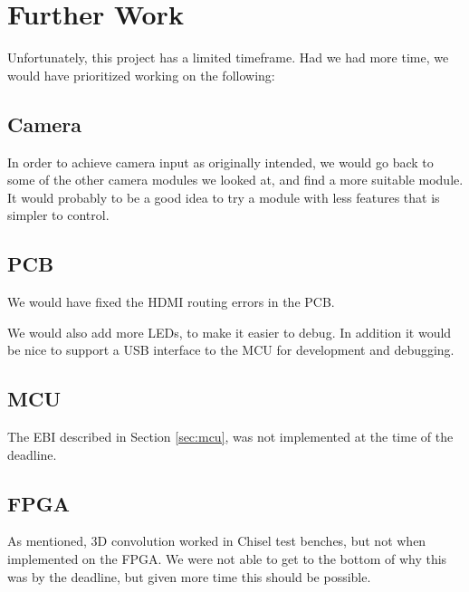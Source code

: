 \section{Further Work}

Unfortunately, this project has a limited timeframe.
Had we had more time, we would have prioritized working on the following:

\subsection{Camera}

In order to achieve camera input as originally intended, we would go back to some of the other camera modules we looked at, and find a more suitable module.
It would probably to be a good idea to try a module with less features that is simpler to control.

\subsection{PCB}

We would have fixed the HDMI routing errors in the PCB.

We would also add more LEDs, to make it easier to debug.
In addition it would be nice to support a USB interface to the MCU for development and debugging.

\subsection{MCU}

The EBI described in Section \ref{sec:mcu}, was not implemented at the time of the deadline.

\subsection{FPGA}

As mentioned, 3D convolution worked in Chisel test benches, but not when implemented on the FPGA.
We were not able to get to the bottom of why this was by the deadline, but given more time this should be possible.

